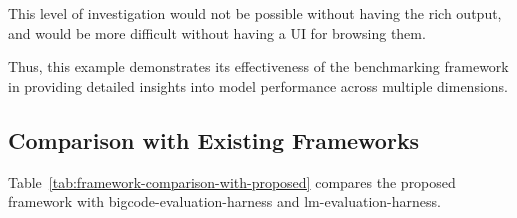 This level of investigation would not be possible without having the rich output, and would be more difficult without having a UI for browsing them.

Thus, this example demonstrates its effectiveness of the benchmarking framework in providing detailed insights into model performance across multiple dimensions.

\subsection{Comparison with Existing Frameworks}

Table~\ref{tab:framework-comparison-with-proposed} compares the proposed framework with bigcode-evaluation-harness and lm-evaluation-harness.


